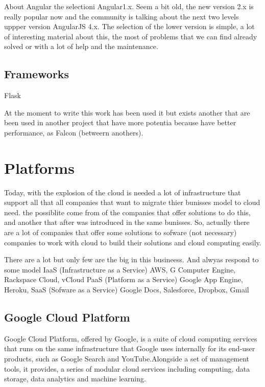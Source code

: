 About Angular the selectioni Angular1.x. Seem a bit old, the new version 2.x
is really popular now and the community is talking about the next two levels
uppper version AngularJS 4.x.
The selection of the lower version is simple, a lot of interesting material
about this, the most of problems that we can find already solved or with a lot
of help and the maintenance.

\subsection{Frameworks}

Flask

At the moment to write this work has been used it but exists another
that are been used in another project that have more potentia because have
better performance, as Falcon (betweern anothers).





\section{Platforms}

Today, with the explosion of the cloud is needed a lot of infrastructure that support
all that all companies that want to migrate thier bunisses model to cloud need. the possiblite
come from of the companies that offer solutions to do this, and another that after
was introduced in the same bunisses.
So, actually there are a lot of companies that offer some solutions to sofware (not necessary)
companies to work with cloud to build their solutions and cloud computing easily.

There are a lot but only few are the big in this busineess. And alwyas respond to some
model
IaaS (Infrastructure as a Service)
AWS, G Computer Engine, Rackspace Cloud, vCloud
PaaS (Platform as a Service)
Google App Engine, Heroku,
SaaS (Sofware as a Service)
 Google Docs, Salesforce, Dropbox, Gmail

\subsection{Google Cloud Platform}
Google Cloud Platform, offered by Google, is a suite of cloud computing services
that runs on the same infrastructure that Google uses internally for its end-user
products, such as Google Search and YouTube.Alongside a set of management tools,
it provides, a series of modular cloud services including computing, data storage,
data analytics and machine learning.

